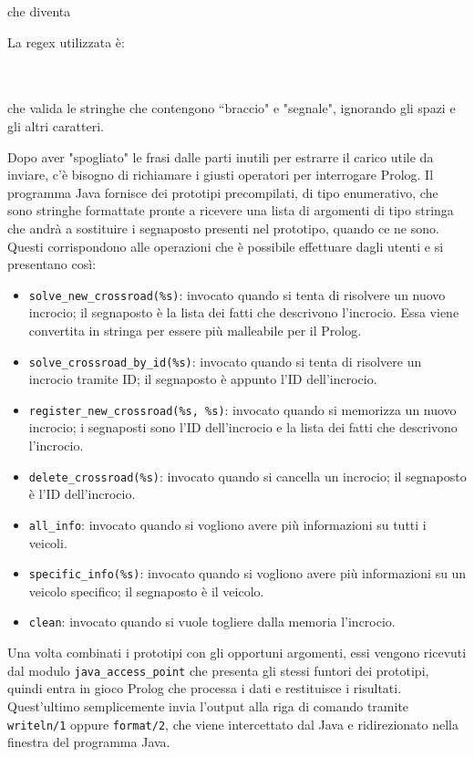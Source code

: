 \mbox{}
\begin{flushleft}
	che diventa
\end{flushleft}
\par \mbox{}

\begin{flushleft}
	La regex utilizzata è:
\end{flushleft}

\par \mbox{} \\\\
che valida le stringhe che contengono ``braccio" e "segnale", ignorando gli spazi e gli altri caratteri.

Dopo aver "spogliato" le frasi dalle parti inutili per estrarre il carico utile da inviare, c'è bisogno di richiamare i giusti operatori per interrogare Prolog. Il programma Java fornisce dei prototipi precompilati, di tipo enumerativo, che sono stringhe formattate pronte a ricevere una lista di argomenti di tipo stringa che andrà a sostituire i segnaposto presenti nel prototipo, quando ce ne sono. Questi corrispondono alle operazioni che è possibile effettuare dagli utenti e si presentano così:
\begin{itemize}
	\item \texttt{solve\_new\_crossroad(\%s)}: invocato quando si tenta di risolvere un nuovo incrocio; il segnaposto è la lista dei fatti che descrivono l'incrocio. Essa viene convertita in stringa per essere più malleabile per il Prolog.
	\item \texttt{solve\_crossroad\_by\_id(\%s)}: invocato quando si tenta di risolvere un incrocio tramite ID; il segnaposto è appunto l'ID dell'incrocio.
	\item \texttt{register\_new\_crossroad(\%s, \%s)}: invocato quando si memorizza un nuovo incrocio; i segnaposti sono l'ID dell'incrocio e la lista dei fatti che descrivono l'incrocio.
	\item \texttt{delete\_crossroad(\%s)}: invocato quando si cancella un incrocio; il segnaposto è l'ID dell'incrocio.
	\item \texttt{all\_info}: invocato quando si vogliono avere più informazioni su tutti i veicoli.
	\item \texttt{specific\_info(\%s)}: invocato quando si vogliono avere più informazioni su un veicolo specifico; il segnaposto è il veicolo.
	\item \texttt{clean}: invocato quando si vuole togliere dalla memoria l'incrocio.
\end{itemize}

Una volta combinati i prototipi con gli opportuni argomenti, essi vengono ricevuti dal modulo \texttt{java\_access\_point} che presenta gli stessi funtori dei prototipi, quindi entra in gioco Prolog che processa i dati e restituisce i risultati. Quest'ultimo semplicemente invia l'output alla riga di comando tramite \texttt{writeln/1} oppure \texttt{format/2}, che viene intercettato dal Java e ridirezionato nella finestra del programma Java.

